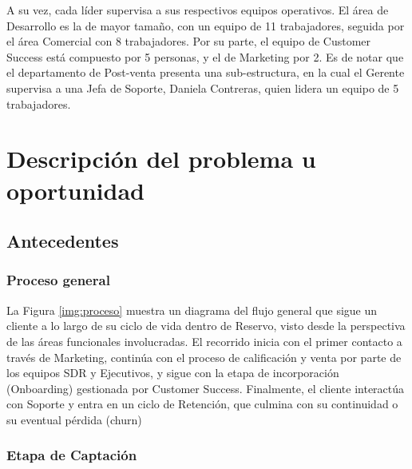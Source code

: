 A su vez, cada líder supervisa a sus respectivos equipos operativos. El área de Desarrollo es la de mayor tamaño, con un equipo de 11 trabajadores, seguida por el área Comercial con 8 trabajadores. Por su parte, el equipo de Customer Success está compuesto por 5 personas, y el de Marketing por 2. Es de notar que el departamento de Post-venta presenta una sub-estructura, en la cual el Gerente supervisa a una Jefa de Soporte, Daniela Contreras, quien lidera un equipo de 5 trabajadores.


\section{Descripción del problema u oportunidad}

\subsection{Antecedentes}


\subsubsection{Proceso general}
La Figura \ref{img:proceso} muestra un diagrama del flujo general que sigue un cliente a lo largo de su ciclo de vida dentro de Reservo, visto desde la perspectiva de las áreas funcionales involucradas. El recorrido inicia con el primer contacto a través de Marketing, continúa con el proceso de calificación y venta por parte de los equipos SDR y Ejecutivos, y sigue con la etapa de incorporación (Onboarding) gestionada por Customer Success. Finalmente, el cliente interactúa con Soporte y entra en un ciclo de Retención, que culmina con su continuidad o su eventual pérdida (churn)



\subsubsection{Etapa de Captación}

